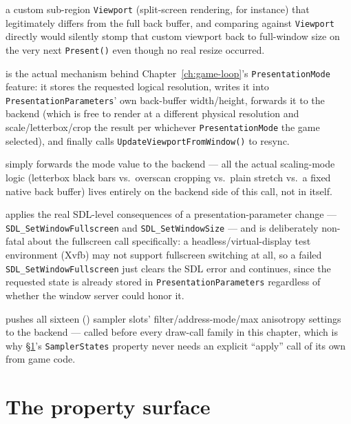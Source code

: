 \begin{description}
  a custom sub-region \texttt{Viewport} (split-screen rendering, for instance) that legitimately
  differs from the full back buffer, and comparing against \texttt{Viewport} directly would
  silently stomp that custom viewport back to full-window size on the very next
  \texttt{Present()} even though no real resize occurred.
\item[\texttt{SetVirtualResolution(width, height)}] is the actual mechanism behind
  Chapter~\ref{ch:game-loop}'s \texttt{PresentationMode} feature: it stores the requested
  logical resolution, writes it into \texttt{PresentationParameters}' own back-buffer
  width/height, forwards it to the backend (which is free to render at a different physical
  resolution and scale/letterbox/crop the result per whichever \texttt{PresentationMode} the
  game selected), and finally calls \texttt{UpdateViewportFromWindow()} to resync.
\item[\texttt{SetPresentationMode(mode)}] simply forwards the mode value to the backend ---
  all the actual scaling-mode logic (letterbox black bars vs.\ overscan cropping vs.\ plain
  stretch vs.\ a fixed native back buffer) lives entirely on the backend side of this call, not
  in  itself.
\item[\texttt{applyPresentationParametersToWindow()}] applies the real SDL-level consequences
  of a presentation-parameter change --- \texttt{SDL\_SetWindowFullscreen} and
  \texttt{SDL\_SetWindowSize} --- and is deliberately non-fatal about the fullscreen call
  specifically: a headless/virtual-display test environment (Xvfb) may not support fullscreen
  switching at all, so a failed \texttt{SDL\_SetWindowFullscreen} just clears the SDL error and
  continues, since the requested state is already stored in \texttt{PresentationParameters}
  regardless of whether the window server could honor it.
\item[\texttt{applySamplerStatesToBackend()}] pushes all sixteen
  () sampler slots' filter/address-mode/max
  anisotropy settings to the backend --- called before every draw-call family in this chapter,
  which is why \S\ref{sec:property-surface}'s \texttt{SamplerStates} property never needs an
  explicit ``apply'' call of its own from game code.
\end{description}

\section{The property surface}
\label{sec:property-surface}

